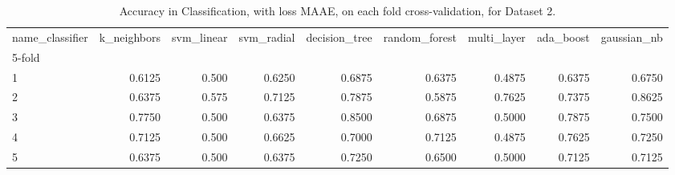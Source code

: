 \begin{table}
\centering
\caption{Accuracy in Classification, with loss MAAE, on each fold cross-validation, for Dataset 2.}
\label{table:acc-maae-chbmit-fold-2}
\begin{tabular}{lrrrrrrrr}
\toprule
name\_classifier &  k\_neighbors &  svm\_linear &  svm\_radial &  decision\_tree &  random\_forest &  multi\_layer &  ada\_boost &  gaussian\_nb \\
5-fold &              &             &             &                &                &              &            &              \\
\midrule
1      &       0.6125 &       0.500 &      0.6250 &         0.6875 &         0.6375 &       0.4875 &     0.6375 &       0.6750 \\
2      &       0.6375 &       0.575 &      0.7125 &         0.7875 &         0.5875 &       0.7625 &     0.7375 &       0.8625 \\
3      &       0.7750 &       0.500 &      0.6375 &         0.8500 &         0.6875 &       0.5000 &     0.7875 &       0.7500 \\
4      &       0.7125 &       0.500 &      0.6625 &         0.7000 &         0.7125 &       0.4875 &     0.7625 &       0.7250 \\
5      &       0.6375 &       0.500 &      0.6375 &         0.7250 &         0.6500 &       0.5000 &     0.7125 &       0.7125 \\
\bottomrule
\end{tabular}
\end{table}
